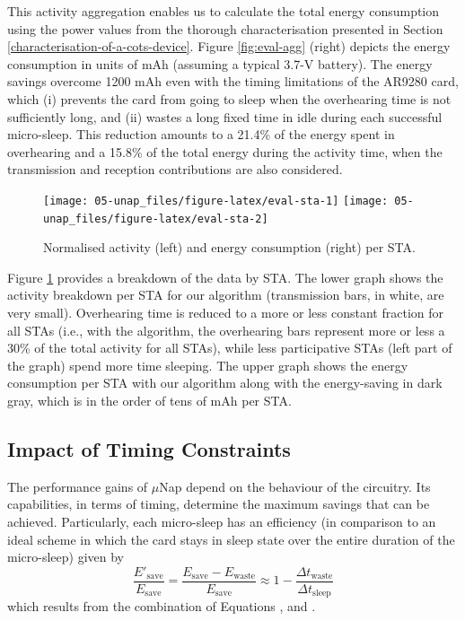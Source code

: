 \documentclass[twoside,nohyper]{tufte-book}
\makeatletter
\let\orig@maketag@@@\maketag@@@
\renewcommand{\eqref}[1]{\textup{\let\maketag@@@\orig@maketag@@@\tagform@{\ref{#1}}}}
\def\maketag@@@#1{\hbox{\rlap{\kern\marginparsep\m@th\normalfont#1}\kern1sp}}
\makeatother
\begin{document}
This activity aggregation enables us to calculate the total energy consumption using the power values from the thorough characterisation presented in Section \ref{characterisation-of-a-cots-device}. Figure \ref{fig:eval-agg} (right) depicts the energy consumption in units of mAh (assuming a typical 3.7-V battery). The energy savings overcome 1200 mAh even with the timing limitations of the AR9280 card, which (i) prevents the card from going to sleep when the overhearing time is not sufficiently long, and (ii) wastes a long fixed time in idle during each successful micro-sleep. This reduction amounts to a 21.4\% of the energy spent in overhearing and a 15.8\% of the total energy during the activity time, when the transmission and reception contributions are also considered.



\begin{figure}

{\centering \texttt{[image: 05-unap\_files/figure-latex/eval-sta-1]} \texttt{[image: 05-unap\_files/figure-latex/eval-sta-2]} 

}

\caption[Normalised activity (left) and energy consumption (right) per STA.]{Normalised activity (left) and energy consumption (right) per STA.}\label{fig:eval-sta}
\end{figure}

Figure \ref{fig:eval-sta} provides a breakdown of the data by STA. The lower graph shows the activity breakdown per STA for our algorithm (transmission bars, in white, are very small). Overhearing time is reduced to a more or less constant fraction for all STAs (i.e., with the algorithm, the overhearing bars represent more or less a 30\% of the total activity for all STAs), while less participative STAs (left part of the graph) spend more time sleeping. The upper graph shows the energy consumption per STA with our algorithm along with the energy-saving in dark gray, which is in the order of tens of mAh per STA.

\hypertarget{impact-of-timing-constraints}{%
\subsection{Impact of Timing Constraints}\label{impact-of-timing-constraints}}

The performance gains of \(\mu\)Nap depend on the behaviour of the circuitry. Its capabilities, in terms of timing, determine the maximum savings that can be achieved. Particularly, each micro-sleep has an efficiency (in comparison to an ideal scheme in which the card stays in sleep state over the entire duration of the micro-sleep) given by
%
\begin{equation}
 \frac{E'_\mathrm{save}}{E_\mathrm{save}} = \frac{E_\mathrm{save} - E_\mathrm{waste}}{E_\mathrm{save}} \approx 1 - \frac{\Delta t_\mathrm{waste}}{\Delta t_\mathrm{sleep}}
 \label{eq:fracsave}
\end{equation}
%
which results from the combination of Equations \eqref{eq:idealsleep}, \eqref{eq:realsleep} and \eqref{eq:Ewaste}.
\end{document}
